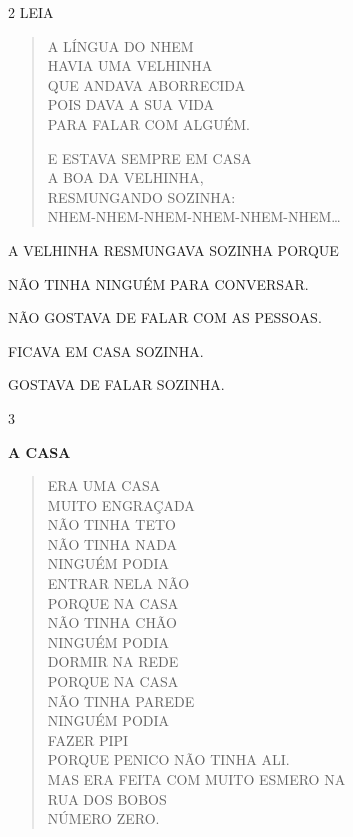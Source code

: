 \begin{escola}
\num{2} LEIA

\begin{verse}
A LÍNGUA DO NHEM\\
HAVIA UMA VELHINHA\\
QUE ANDAVA ABORRECIDA\\
POIS DAVA A SUA VIDA\\
PARA FALAR COM ALGUÉM.

E ESTAVA SEMPRE EM CASA\\
A BOA DA VELHINHA,\\
RESMUNGANDO SOZINHA:\\
NHEM-NHEM-NHEM-NHEM-NHEM-NHEM\ldots{}
\end{verse}


A VELHINHA RESMUNGAVA SOZINHA PORQUE

\begin{escolha}
\item NÃO TINHA NINGUÉM PARA CONVERSAR.

\item NÃO GOSTAVA DE FALAR COM AS PESSOAS.

\item FICAVA EM CASA SOZINHA.

\item GOSTAVA DE FALAR SOZINHA.
\end{escolha}


\num{3}

\textbf{A CASA}

\begin{verse}
ERA UMA CASA\\
MUITO ENGRAÇADA\\
NÃO TINHA TETO\\
NÃO TINHA NADA\\
NINGUÉM PODIA\\
ENTRAR NELA NÃO\\
PORQUE NA CASA\\
NÃO TINHA CHÃO\\
NINGUÉM PODIA\\
DORMIR NA REDE\\
PORQUE NA CASA\\
NÃO TINHA PAREDE\\
NINGUÉM PODIA\\
FAZER PIPI\\
PORQUE PENICO NÃO TINHA ALI.\\
MAS ERA FEITA COM MUITO ESMERO NA\\
RUA DOS BOBOS\\
NÚMERO ZERO.
\end{verse}


\end{escola}
